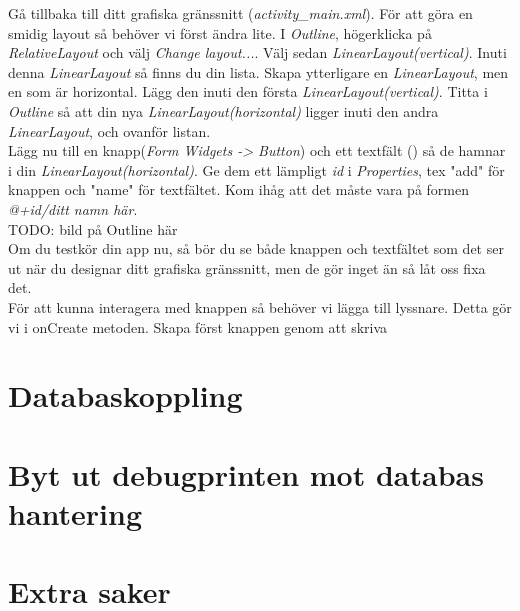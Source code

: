 \documentclass[11 pt]{article} %
\begin{document}
Gå tillbaka till ditt grafiska gränssnitt (\textit{activity\_main.xml}). För att göra en smidig layout så behöver vi först ändra lite. I \textit{Outline}, högerklicka på \textit{RelativeLayout} och välj \textit{Change layout...}. Välj sedan \textit{LinearLayout(vertical)}. Inuti denna \textit{LinearLayout} så finns du din lista. Skapa ytterligare en \textit{LinearLayout}, men en som är horizontal. Lägg den inuti den första \textit{LinearLayout(vertical)}. Titta i \textit{Outline} så att din nya \textit{LinearLayout(horizontal)} ligger inuti den andra \textit{LinearLayout}, och ovanför listan.\\

Lägg nu till en knapp(\textit{Form Widgets -> Button}) och ett textfält () så de hamnar i din \textit{LinearLayout(horizontal)}. Ge dem ett lämpligt \textit{id} i \textit{Properties}, tex "add" för knappen och "name" för textfältet. Kom ihåg att det måste vara på formen \textit{@+id/ditt namn här}.\\

TODO: bild på Outline här\\

Om du testkör din app nu, så bör du se både knappen och textfältet som det ser ut när du designar ditt grafiska gränssnitt, men de gör inget än så låt oss fixa det. \\

För att kunna interagera med knappen så behöver vi lägga till lyssnare. Detta gör vi i onCreate metoden.
Skapa först knappen genom att skriva 



\section{Databaskoppling}

\section{Byt ut debugprinten mot databas hantering}

\section{Extra saker}
\end{document}
